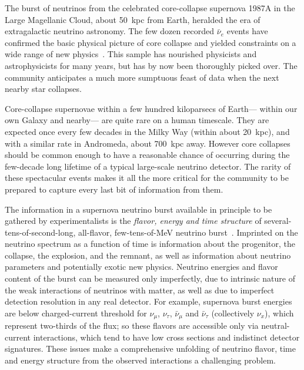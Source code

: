 


The burst of neutrinos from the celebrated core-collapse supernova 1987A in the Large Magellanic Cloud, about
50~kpc from Earth, heralded the era of extragalactic neutrino
astronomy.  The few dozen recorded $\bar{\nu}_e$ events
have confirmed the basic physical
picture of core collapse and yielded constraints on a wide range of new
physics~\cite{Schramm:1990pf, Vissani:2014doa}.   This sample has nourished physicists and
astrophysicists for many years, but has
by now been thoroughly picked over.  The community anticipates a
much more sumptuous feast of data when the next nearby star collapses.

Core-collapse supernovae within a few hundred kiloparsecs of Earth---
within our own Galaxy and nearby--- are quite rare on a human
timescale.  They are expected once every few decades in the Milky Way
(within about 20~kpc), and with a similar rate in Andromeda, about
700~kpc away.  However core collapses should be common enough to have
a reasonable chance of occurring during the few-decade long lifetime
of a typical large-scale neutrino detector.  The rarity of these
spectacular events makes it all the more critical for the community to
be prepared to capture every last bit of information from them.

The information in a supernova neutrino burst available in principle
to be gathered by experimentalists is the \textit{flavor, energy and
  time structure} of several-tens-of-second-long, all-flavor,
few-tens-of-MeV neutrino burst~\cite{Mirizzi:2015eza, Horiuchi:2017sku}.  Imprinted on
the neutrino spectrum as a function of time is information about the
progenitor, the collapse, the explosion, and the remnant, as well as
information about neutrino parameters and potentially exotic new
physics.  Neutrino energies and flavor content of the burst can be
measured only imperfectly, due to intrinsic nature of the weak
interactions of neutrinos with matter, as well as due to imperfect
detection resolution in any real detector.  For example, supernova
burst energies are below charged-current threshold for $\nu_\mu$,
$\nu_\tau$, $\bar{\nu}_\mu$ and $\bar{\nu}_{\tau}$ (collectively
$\nu_x$), which represent two-thirds of the flux; so these flavors are
accessible only via neutral-current interactions, which tend to have
low cross sections and indistinct detector signatures. These issues make a
comprehensive unfolding of neutrino flavor, time and energy structure
from the observed interactions a challenging problem.

